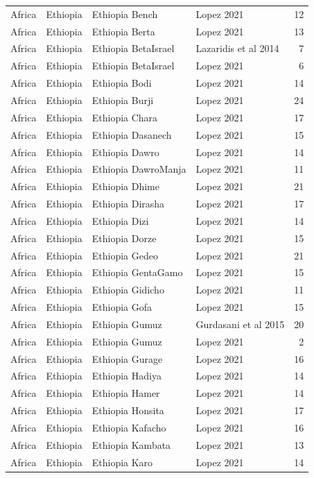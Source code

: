 \begin{longtable}[t]{lll>{\raggedright\arraybackslash}p{9em}r}
Africa & Ethiopia & Ethiopia Bench & Lopez 2021 & 12\\
Africa & Ethiopia & Ethiopia Berta & Lopez 2021 & 13\\
Africa & Ethiopia & Ethiopia BetaIsrael & Lazaridis et al 2014 & 7\\
\addlinespace
Africa & Ethiopia & Ethiopia BetaIsrael & Lopez 2021 & 6\\
Africa & Ethiopia & Ethiopia Bodi & Lopez 2021 & 14\\
Africa & Ethiopia & Ethiopia Burji & Lopez 2021 & 24\\
Africa & Ethiopia & Ethiopia Chara & Lopez 2021 & 17\\
Africa & Ethiopia & Ethiopia Dasanech & Lopez 2021 & 15\\
\addlinespace
Africa & Ethiopia & Ethiopia Dawro & Lopez 2021 & 14\\
Africa & Ethiopia & Ethiopia DawroManja & Lopez 2021 & 11\\
Africa & Ethiopia & Ethiopia Dhime & Lopez 2021 & 21\\
Africa & Ethiopia & Ethiopia Dirasha & Lopez 2021 & 17\\
Africa & Ethiopia & Ethiopia Dizi & Lopez 2021 & 14\\
\addlinespace
Africa & Ethiopia & Ethiopia Dorze & Lopez 2021 & 15\\
Africa & Ethiopia & Ethiopia Gedeo & Lopez 2021 & 21\\
Africa & Ethiopia & Ethiopia GentaGamo & Lopez 2021 & 15\\
Africa & Ethiopia & Ethiopia Gidicho & Lopez 2021 & 11\\
Africa & Ethiopia & Ethiopia Gofa & Lopez 2021 & 15\\
\addlinespace
Africa & Ethiopia & Ethiopia Gumuz & Gurdasani et al 2015 & 20\\
Africa & Ethiopia & Ethiopia Gumuz & Lopez 2021 & 2\\
Africa & Ethiopia & Ethiopia Gurage & Lopez 2021 & 16\\
Africa & Ethiopia & Ethiopia Hadiya & Lopez 2021 & 14\\
Africa & Ethiopia & Ethiopia Hamer & Lopez 2021 & 14\\
\addlinespace
Africa & Ethiopia & Ethiopia Honsita & Lopez 2021 & 17\\
Africa & Ethiopia & Ethiopia Kafacho & Lopez 2021 & 16\\
Africa & Ethiopia & Ethiopia Kambata & Lopez 2021 & 13\\
Africa & Ethiopia & Ethiopia Karo & Lopez 2021 & 14\\

\end{longtable}
